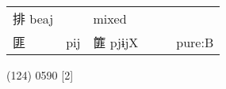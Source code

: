 \documentclass[14pt,a4paper]{scrartcl}
\begin{document}
\begin{longtable}[c]{@{}llllll@{}}
\begin{minipage}[t]{0.14\columnwidth}
排 beaj
\strut\end{minipage} &
\begin{minipage}[t]{0.14\columnwidth}\raggedright\strut
\strut\end{minipage} &
\begin{minipage}[t]{0.14\columnwidth}\raggedright\strut
mixed
\strut\end{minipage}\tabularnewline
\begin{minipage}[t]{0.14\columnwidth}\raggedright\strut
匪
\strut\end{minipage} &
\begin{minipage}[t]{0.14\columnwidth}\raggedright\strut
pij
\strut\end{minipage} &
\begin{minipage}[t]{0.14\columnwidth}\raggedright\strut
篚 pjɨjX
\strut\end{minipage} &
\begin{minipage}[t]{0.14\columnwidth}\raggedright\strut
\strut\end{minipage} &
\begin{minipage}[t]{0.14\columnwidth}\raggedright\strut
\strut\end{minipage} &
\begin{minipage}[t]{0.14\columnwidth}\raggedright\strut
pure:B
\strut\end{minipage}\tabularnewline
\bottomrule
\end{longtable}

(124) 0590 {[}2{]}
\end{document}
